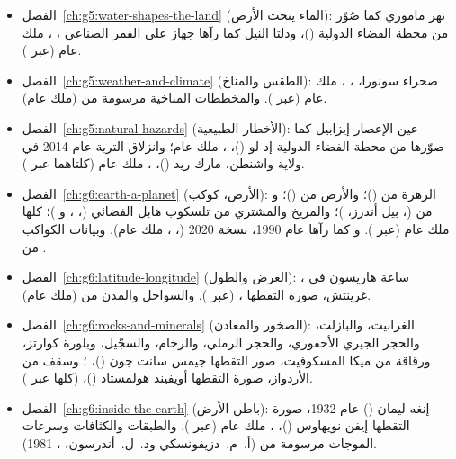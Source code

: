 \begin{itemize}
  \item الفصل~\ref{ch:g5:water-shapes-the-land} (الماء ينحت الأرض): نهر ماموري كما صُوّر من محطة الفضاء الدولية ()، ودلتا النيل كما رآها جهاز  على القمر الصناعي ، ، ملك عام (عبر ).
  \item الفصل~\ref{ch:g5:weather-and-climate} (الطقس والمناخ): صحراء سونورا، ، ، ملك عام (عبر ). والمخططات المناخية مرسومة من  (ملك عام).
  \item الفصل~\ref{ch:g5:natural-hazards} (الأخطار الطبيعية): عين الإعصار إيزابيل كما صوّرها من محطة الفضاء الدولية إد لو ()، ، ملك عام؛ وانزلاق التربة عام 2014 في ولاية واشنطن، مارك ريد ()، ، ملك عام (كلتاهما عبر ).
  \item الفصل~\ref{ch:g6:earth-a-planet} (الأرض، كوكب): الزهرة من  ()؛ والأرض من  ()؛ و من  (، بيل أندرز، )؛ والمريخ والمشتري من تلسكوب هابل الفضائي (، ،  و )؛ كلها ملك عام (عبر ). و كما رآها  عام 1990، نسخة 2020 (، ، ملك عام). وبيانات الكواكب من .
  \item الفصل~\ref{ch:g6:latitude-longitude} (العرض والطول): ساعة هاريسون  في ، غرينتش، صورة التقطها ،  (عبر ). والسواحل والمدن من  (ملك عام).
  \item الفصل~\ref{ch:g6:rocks-and-minerals} (الصخور والمعادن): الغرانيت، والبازلت، والحجر الجيري الأحفوري، والحجر الرملي، والرخام، والسجّيل، وبلورة كوارتز، ورقاقة من ميكا المسكوفيت، صور التقطها جيمس سانت جون ()، ؛ وسقف من الأردواز، صورة التقطها أويفيند هولمستاد ()،  (كلها عبر ).
  \item الفصل~\ref{ch:g6:inside-the-earth} (باطن الأرض): إنغه ليمان () عام 1932، صورة التقطها إيفن نويهاوس ()، ، ملك عام (عبر ). والطبقات والكثافات وسرعات الموجات مرسومة من  (أ.~م.~دزيفونسكي ود.~ل.~أندرسون، ، 1981).

\end{itemize}
